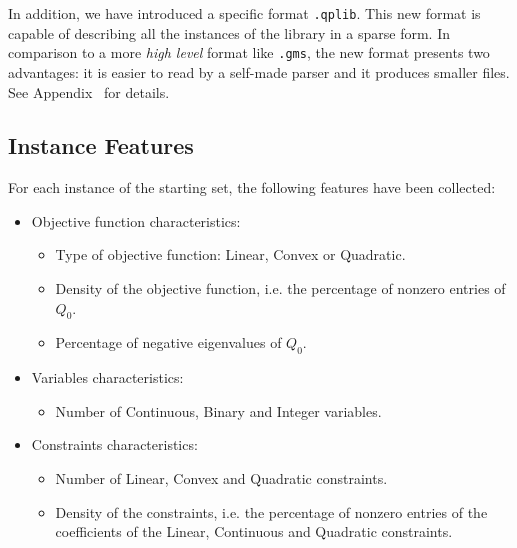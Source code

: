 In addition, we have introduced
a specific format \texttt{.qplib}. This new format is capable of describing
all the instances of the library in a sparse form.
In comparison to a more \emph{high level} format like \texttt{.gms}, the new
format presents two advantages:
it is easier to read by a self-made parser and it produces smaller files.
See Appendix~\label{sec:format} for details.





\subsection{Instance Features}\label{subsec:feature}

%

For each instance of the starting set, the following features have been collected:
\begin{itemize}
\item Objective function characteristics:
\begin{itemize}
\item Type of objective function:  Linear, Convex or Quadratic.
\item Density of the objective function, i.e. the percentage of nonzero entries of $Q_0$.
\item Percentage of negative eigenvalues of $Q_0$.
\end{itemize}
\item Variables characteristics:
\begin{itemize}
\item Number of Continuous, Binary and Integer variables.
\end{itemize}
\item Constraints characteristics:
\begin{itemize}
\item Number of Linear, Convex and Quadratic constraints.
\item Density of the constraints, i.e. the percentage of nonzero entries of the coefficients of the Linear, Continuous and Quadratic constraints.
\end{itemize}
\end{itemize}


